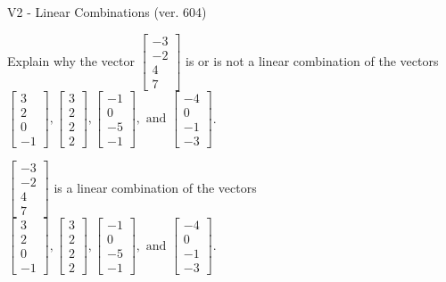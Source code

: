 \begin{exercise}
  \begin{exerciseTitle}V2 - Linear Combinations (ver. 604)\end{exerciseTitle}
  \begin{exerciseStatement}
    Explain why the vector \(\left[\begin{array}{c}
-3 \\
-2 \\
4 \\
7
\end{array}\right]\)  is or is not a linear 
	combination of the vectors \(\left[\begin{array}{c}
3 \\
2 \\
0 \\
-1
\end{array}\right] , \left[\begin{array}{c}
3 \\
2 \\
2 \\
2
\end{array}\right] , \left[\begin{array}{c}
-1 \\
0 \\
-5 \\
-1
\end{array}\right] , \text{ and } \left[\begin{array}{c}
-4 \\
0 \\
-1 \\
-3
\end{array}\right]\).
	


  \end{exerciseStatement}
  \begin{exerciseAnswer}
   \(\left[\begin{array}{c}
-3 \\
-2 \\
4 \\
7
\end{array}\right]\) 
  	 is  
	a linear combination of the vectors \(\left[\begin{array}{c}
3 \\
2 \\
0 \\
-1
\end{array}\right] , \left[\begin{array}{c}
3 \\
2 \\
2 \\
2
\end{array}\right] , \left[\begin{array}{c}
-1 \\
0 \\
-5 \\
-1
\end{array}\right] , \text{ and } \left[\begin{array}{c}
-4 \\
0 \\
-1 \\
-3
\end{array}\right]\).


\end{exerciseAnswer}
\end{exercise}
